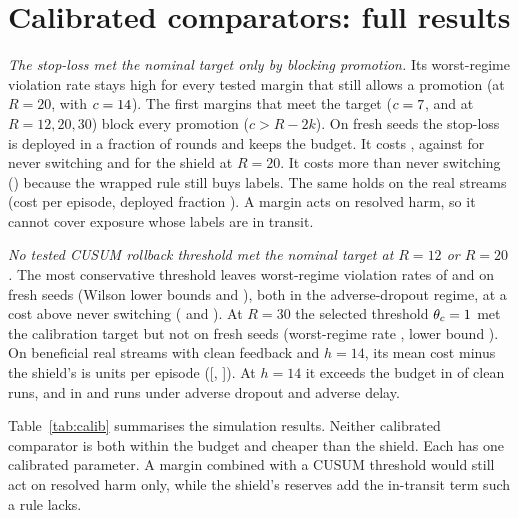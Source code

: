 \documentclass[10pt]{article}
\theoremstyle{plain}
\theoremstyle{definition}
\begin{document}
\section{Calibrated comparators: full results}\label{app:calibres}
\emph{The stop-loss met the nominal target only by blocking promotion.} Its worst-regime violation rate stays high for every tested margin that still allows a promotion (at $R=20$, \CalStopLastViol{} with $c=14$). The first margins that meet the target ($c=7$, \CalStopCB{} and \CalStopCC{} at $R=12,20,30$) block every promotion ($c>R-2k$). On fresh seeds the stop-loss is deployed in a fraction \CalStopDepB{} of rounds and keeps the budget. It costs \CalStopJB{}, against \CalNeverJ{} for never switching and \CalShieldJB{} for the shield at $R=20$. It costs more than never switching (\CalStopDNever) because the wrapped rule still buys labels. The same holds on the real streams (cost \RCalStopJ{} per episode, deployed fraction \RCalStopDep{}). A margin acts on resolved harm, so it cannot cover exposure whose labels are in transit.

\emph{No tested CUSUM rollback threshold met the nominal target at $R=12$ or $R=20$.} The most conservative threshold leaves worst-regime violation rates of \CalCusWorstA{} and \CalCusWorstB{} on fresh seeds (Wilson lower bounds \CalCusWorstLoA{} and \CalCusWorstLoB), both in the adverse-dropout regime, at a cost above never switching (\CalCusDNeverA{} and \CalCusDNeverB). At $R=30$ the selected threshold $\theta_c=1{}$ met the calibration target but not on fresh seeds (worst-regime rate \CalCusWorstC, lower bound \CalCusWorstLoC). On beneficial real streams with clean feedback and $h=14$, its mean cost minus the shield's is \RCalCusVsShield{} units per episode ([\RCalCusVsShieldLo, \RCalCusVsShieldHi]). At $h=14$ it exceeds the budget in \RCalCusViolCleanFourteen{} of \RealRunsPerArm{} clean runs, and in \RCalCusViolDropFourteen{} and \RCalCusViolDelayFourteen{} runs under adverse dropout and adverse delay.

Table~\ref{tab:calib} summarises the simulation results. Neither calibrated comparator is both within the budget and cheaper than the shield. Each has one calibrated parameter. A margin combined with a CUSUM threshold would still act on resolved harm only, while the shield's reserves add the in-transit term such a rule lacks.

\begin{table}[!htbp]
\caption{Calibrated comparators (fresh simulation seeds, \NRegimes{} regimes). Each comparator's safety parameter was selected on separate calibration seeds against a nominal per-regime violation target of $.05$; a setting qualified if its empirical rate was at most $.05$ in every regime. Selected margins $c=7,15,25$ at $R=12,20,30$; selected CUSUM thresholds $\theta_c=.5,.5,1$, of which only $R=30$ qualified (the others are the most conservative grid value). ``vs never'' is the pooled difference in $J$. Costs differ slightly from Table~\ref{tab:sim}, which uses the registered seeds.}\label{tab:calib}
\centering
{\setlength{\tabcolsep}{4pt}\footnotesize}
\end{table}
\end{document}
